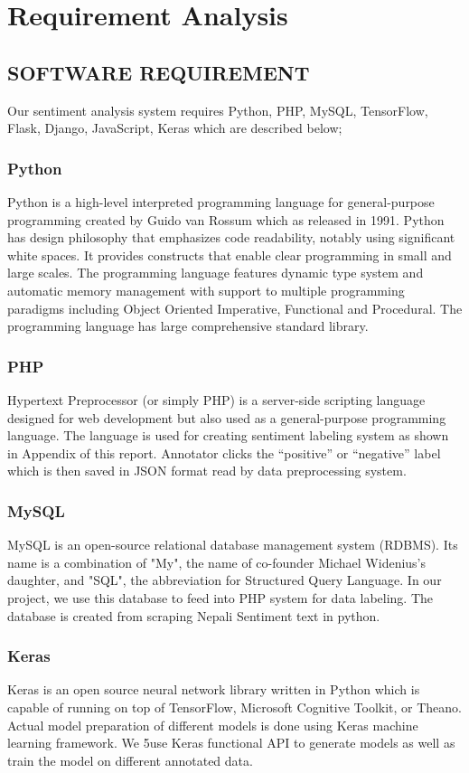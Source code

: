       \chapter{Requirement Analysis}
        \section{SOFTWARE REQUIREMENT}
Our sentiment analysis system requires Python, PHP, MySQL, TensorFlow, Flask,
Django, JavaScript, Keras which are described below;
            \subsection{Python}
Python is a high-level interpreted programming language for general-purpose
programming created by Guido van Rossum which as released in 1991. Python has
design philosophy that emphasizes code readability, notably using significant white
spaces. It provides constructs that enable clear programming in small and large scales.
The programming language features dynamic type system and automatic memory
management with support to multiple programming paradigms including Object
Oriented Imperative, Functional and Procedural. The programming language has large
comprehensive standard library.
            \subsection{PHP}
Hypertext Preprocessor (or simply PHP) is a server-side scripting language designed
for web development but also used as a general-purpose programming language. The
language is used for creating sentiment labeling system as shown in Appendix of this
report. Annotator clicks the “positive” or “negative” label which is then saved in JSON
format read by data preprocessing system.
            \subsection{MySQL}
MySQL is an open-source relational database management system (RDBMS). Its name
is a combination of "My", the name of co-founder Michael Widenius's daughter, and
"SQL", the abbreviation for Structured Query Language. In our project, we use this
database to feed into PHP system for data labeling. The database is created from
scraping Nepali Sentiment text in python.
            \subsection{Keras}
Keras is an open source neural network library written in Python which is capable of
running on top of TensorFlow, Microsoft Cognitive Toolkit, or Theano. Actual model
preparation of different models is done using Keras machine learning framework. We
5use Keras functional API to generate models as well as train the model on different
annotated data.
